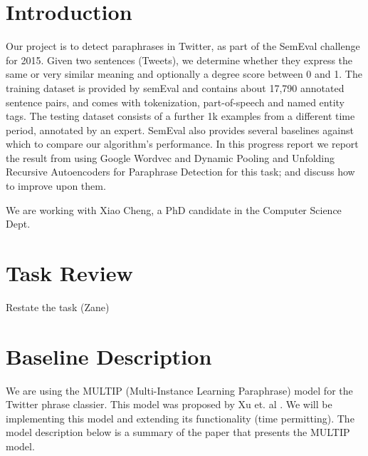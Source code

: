\documentclass[conference]{IEEEtran}
\begin{document}



%
\IEEEpeerreviewmaketitle



\section{Introduction}
Our project is to detect paraphrases in Twitter, as part of the SemEval challenge for 2015.   Given two sentences (Tweets), we determine whether they express the same or very similar meaning and optionally a degree score between 0 and 1.  The training dataset is provided by semEval and contains about 17,790 annotated sentence pairs, and comes with tokenization, part-of-speech and named entity tags.  The testing dataset consists of a further 1k examples from a different time period, annotated by an expert.  SemEval also provides several baselines against which to compare our algorithm's performance.  In this progress report we report the result from using Google Wordvec and Dynamic Pooling and Unfolding Recursive Autoencoders for Paraphrase Detection for this task; and discuss how to improve upon them.


We are working with  Xiao Cheng, a PhD candidate in the Computer Science Dept.


\section{Task Review}
Restate the task (Zane)

\section{Baseline Description}
We are using the MULTIP (Multi-Instance Learning Paraphrase) model for the Twitter phrase classier. This model was proposed by Xu et. al \cite{zane}. We will be implementing this model and extending its functionality (time permitting). The model description below is a summary of the paper that presents the MULTIP model. \medskip
\end{document}
